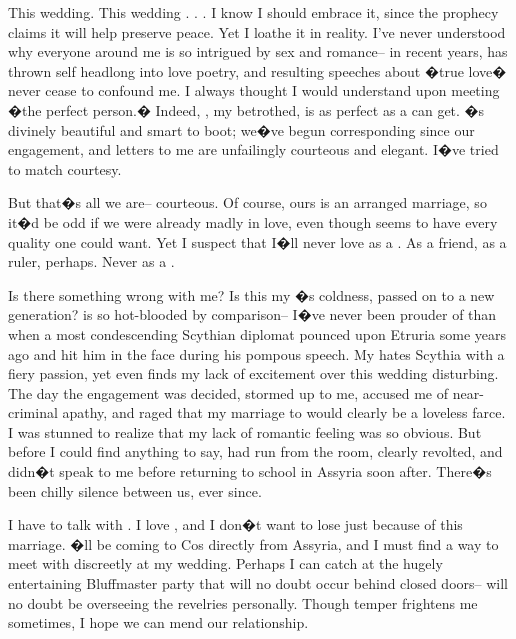\documentclass[char]{Kos}
\begin{document}
This wedding. This wedding . . . I know I should embrace it, since the prophecy claims it will help preserve peace. Yet I loathe it in reality. I've never understood why everyone around me is so intrigued by sex and romance-- in recent years, \cPoet{\nickname} has thrown \cPoet{\them}self headlong into love poetry, and \cPoet{\their} resulting speeches about �true love� never cease to confound me. I always thought I would understand upon meeting �the perfect person.� Indeed, \cBride{\nickname}, my betrothed, is as perfect as a \cBride{\human} can get. \cBride{\They}�s divinely beautiful and smart to boot; we�ve begun corresponding since our engagement, and \cBride{\their} letters to me are unfailingly courteous and elegant. I�ve tried to match \cBride{\their} courtesy. 

But that�s all we are-- courteous. Of course, ours is an arranged marriage, so it�d be odd if we were already madly in love, even though \cBride{\they} seems to have every quality one could want. Yet I suspect that I�ll never love \cBride{\them} as a \cBride{\spouse}. As a friend, as a ruler, perhaps. Never as a \cBride{\spouse}.

Is there something wrong with me? Is this my \cEtruriaKing{\parent}�s coldness, passed on to a new generation? \cPoet{\nickname} is so hot-blooded by comparison-- I�ve never been prouder of \cPoet{\them} than when a most condescending Scythian diplomat pounced upon Etruria some years ago and \cPoet{\they} hit him in the face during his pompous speech. My \cPoet{\sibling} hates Scythia with a fiery passion, yet even \cPoet{\they} finds my lack of excitement over this wedding disturbing. The day the engagement was decided, \cPoet{\they} stormed up to me, accused me of near-criminal apathy, and raged that my marriage to \cBride{\nickname} would clearly be a loveless farce. I was stunned to realize that my lack of romantic feeling was so obvious. But before I could find anything to say, \cPoet{\nickname} had run from the room, clearly revolted, and \cPoet{\they} didn�t speak to me before returning to school in Assyria soon after. There�s been chilly silence between us, ever since.

I have to talk with \cPoet{\nickname}. I love \cPoet{\them}, and I don�t want to lose \cPoet{\them} just because of this marriage. \cPoet{\They}�ll be coming to Cos directly from Assyria, and I must find a way to meet with \cPoet{\them} discreetly at my wedding. Perhaps I can catch \cPoet{\them} at the hugely entertaining Bluffmaster party that will no doubt occur behind closed doors-- \cPoet{\nickname} will no doubt be overseeing the revelries personally. Though \cPoet{\their} temper frightens me sometimes, I hope we can mend our relationship.
\end{document}
